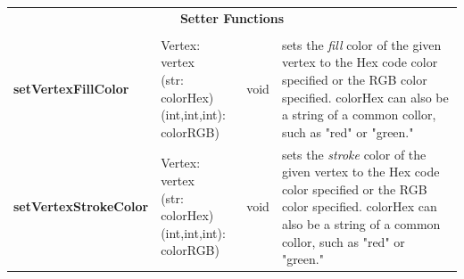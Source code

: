 \documentclass{article}
\newlength\q
\newlength\smallCol
\newlength\argsLen
\begin{document}
\begin{table}[h]
\begin{tabular}{m{\smallCol}m{\argsLen}m{\smallCol}m{\q}}
\\\multicolumn{4}{c}{\textbf{Setter Functions}}\\\\\hline
\textbf{setVertexFillColor} & \makecell{Vertex: vertex\\(str: colorHex)\\(int,int,int): colorRGB)} & void & sets the \textit{fill} color of the given vertex to the Hex code color specified or the RGB color specified. colorHex can also be a string of a common collor, such as "red" or "green."  \\ \hline
\textbf{setVertexStrokeColor} & \makecell{Vertex: vertex\\(str: colorHex)\\(int,int,int): colorRGB)} & void & sets the \textit{stroke} color of the given vertex to the Hex code color specified or the RGB color specified. colorHex can also be a string of a common collor, such as "red" or "green."  \\ \hline
\end{tabular}
\end{table}
\end{document}
